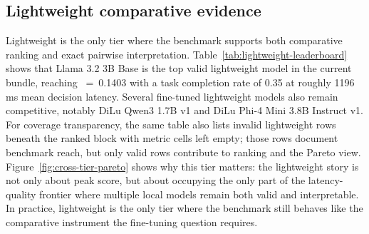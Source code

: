 \subsection{Lightweight comparative evidence}

Lightweight is the only tier where the benchmark supports both comparative ranking and exact pairwise interpretation. Table~\ref{tab:lightweight-leaderboard} shows that Llama 3.2 3B Base is the top valid lightweight model in the current bundle, reaching ~=~0.1403 with a task completion rate of 0.35 at roughly 1196 ms mean decision latency. Several fine-tuned lightweight models also remain competitive, notably DiLu Qwen3 1.7B v1 and DiLu Phi-4 Mini 3.8B Instruct v1. For coverage transparency, the same table also lists invalid lightweight rows beneath the ranked block with metric cells left empty; those rows document benchmark reach, but only valid rows contribute to ranking and the Pareto view. Figure~\ref{fig:cross-tier-pareto} shows why this tier matters: the lightweight story is not only about peak score, but about occupying the only part of the latency-quality frontier where multiple local models remain both valid and interpretable. In practice, lightweight is the only tier where the benchmark still behaves like the comparative instrument the fine-tuning question requires.

